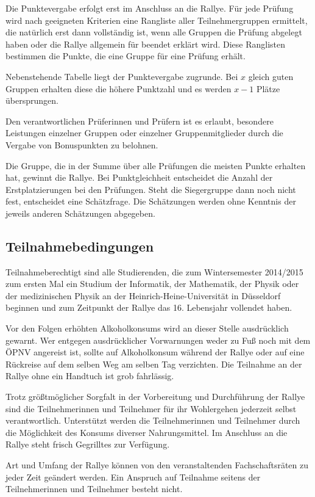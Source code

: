 \documentclass[a4paper,10pt]{article}
\begin{document}
Die Punktevergabe erfolgt erst im Anschluss an die Rallye. Für jede
Prüfung wird nach geeigneten Kriterien eine Rangliste aller
Teilnehmergruppen ermittelt, die natürlich erst dann vollständig ist,
wenn alle Gruppen die Prüfung abgelegt haben oder die Rallye allgemein
für beendet erklärt wird. Diese Ranglisten bestimmen die Punkte, die
eine Gruppe für eine Prüfung erhält.

Nebenstehende Tabelle liegt der Punktevergabe zugrunde. Bei $x$ gleich
guten Gruppen erhalten diese die höhere Punktzahl und es werden $x-1$ Plätze
übersprungen.

Den verantwortlichen Prüferinnen und Prüfern ist es erlaubt, besondere
Leistungen einzelner Gruppen oder einzelner Gruppenmitglieder durch die
Vergabe von Bonuspunkten zu belohnen.

Die Gruppe, die in der Summe über alle Prüfungen die meisten Punkte
erhalten hat, gewinnt die Rallye. Bei Punktgleichheit entscheidet die
Anzahl der Erstplatzierungen bei den Prüfungen. Steht die Siegergruppe
dann noch nicht fest, entscheidet eine Schätzfrage. Die Schätzungen
werden ohne Kenntnis der jeweils anderen Schätzungen abgegeben.

\subsection{Teilnahmebedingungen}

Teilnahmeberechtigt sind alle Studierenden, die zum Wintersemester 
2014/2015 zum ersten Mal ein Studium der
Informatik, der Mathematik, der Physik oder der medizinischen Physik an
der Heinrich-Heine-Universität in Düsseldorf beginnen und zum Zeitpunkt
der Rallye das 16. Lebensjahr vollendet haben.

Vor den Folgen erhöhten Alkoholkonsums wird an dieser Stelle
ausdrücklich gewarnt. Wer entgegen ausdrücklicher Vorwarnungen weder zu
Fuß noch mit dem ÖPNV angereist ist, sollte auf Alkoholkonsum während
der Rallye oder auf eine Rückreise auf dem selben Weg am selben Tag
verzichten. Die Teilnahme an der Rallye ohne ein Handtuch ist grob
fahrlässig.

Trotz größtmöglicher Sorgfalt in der Vorbereitung und Durchführung der
Rallye sind die Teilnehmerinnen und Teilnehmer für ihr Wohlergehen 
jederzeit selbst verantwortlich. Unterstützt werden die Teilnehmerinnen
und Teilnehmer durch die Möglichkeit des Konsums diverser Nahrungsmittel. 
Im Anschluss an die Rallye steht frisch Gegrilltes zur Verfügung.

Art und Umfang der Rallye können von den veranstaltenden Fachschaftsräten
zu jeder Zeit geändert werden. Ein Anspruch auf Teilnahme seitens der 
Teilnehmerinnen und Teilnehmer besteht nicht.
\end{document}
